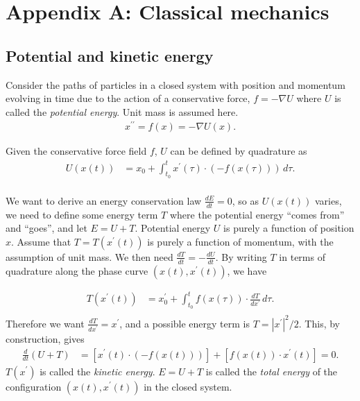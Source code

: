 \documentclass{article}
\newcommand{\pr}{\prime}
\newcommand{\ppr}{{\prime\prime}}
\begin{document}
\section{Appendix A: Classical mechanics}
\subsection{Potential and kinetic energy} %
Consider the paths of particles in a closed system with position and momentum evolving in time
due to the action of a conservative force, $f = -\nabla U$ where $U$ is called the \textit{potential energy}.
Unit mass is assumed here.
\begin{equation}
\begin{split}
    x^\ppr = f(x) = -\nabla U(x).
\end{split}
\end{equation}

Given the conservative force field $f$, $U$ can be defined by quadrature as
\begin{equation}
\begin{split}
    U(x(t)) &= x_0 + \int_{t_0}^t x^\pr(\tau) \cdot(-f(x(\tau)))\, d\tau. \\
\end{split}
\end{equation}

We want to derive an energy conservation law $\frac{dE}{dt} = 0$, so as $U(x(t))$ varies, we need to define
some energy term $T$ where the potential energy ``comes from'' and ``goes'', and let $E = U + T$.
Potential energy $U$ is purely a function of position $x$. Assume that $T = T(x^\pr(t))$ is purely a function of momentum, with the assumption of unit mass.
We then need $\frac{dT}{dt} = -\frac{dU}{dt}$. By writing $T$ in terms of quadrature along the phase curve $(x(t),x^\pr(t))$, we have

\begin{equation}
\begin{split}
    T(x^\pr(t)) &= x_0^\pr + \int_{t_0}^t f(x(\tau)) \cdot \frac{dT}{dx^\pr}\, d\tau. \\
\end{split}
\end{equation}
Therefore we want $\frac{dT}{dx^\pr} = x^\pr$, and a possible energy term is $T = |x^\pr|^2/2$.
This, by construction, gives
\begin{equation}
\begin{split}
    \frac{d}{dt}\left(U + T\right) &= \left[x^\pr(t)\cdot (-f(x(t)))\right] + \left[f(x(t))\cdot x^\pr(t)\right] = 0.
\end{split}
\end{equation}
$T(x^\pr)$ is called the \textit{kinetic energy}. $E = U + T$ is called the \textit{total energy} of the configuration $(x(t), x^\pr(t))$ in the closed system.
\end{document}

